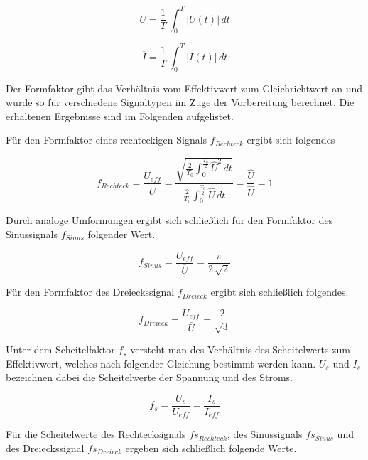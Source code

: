 \documentclass[11pt,ngerman]{scrartcl}
\begin{document}
\begin{equation}
	\overline{U} = \frac{1}{T}\,  \int_{0}^{T} |U(t)|\, dt
	\label{eq:ugl}
\end{equation}

\begin{equation}
	\overline{I} = \frac{1}{T}\,  \int_{0}^{T} |I(t)| \,dt
	\label{eq:igl}
\end{equation}

Der Formfaktor gibt das Verhältnis vom Effektivwert zum Gleichrichtwert an und wurde so für verschiedene Signaltypen im Zuge der Vorbereitung berechnet. Die erhaltenen Ergebnisse sind im Folgenden aufgelistet.

Für den Formfaktor eines rechteckigen Signals $f_{Rechteck}$ ergibt sich folgendes

\begin{equation}
	f_{Rechteck} = \frac{U_{eff}}{\overline{U}} = \frac{ \sqrt{ \frac{2}{T_0} \int_{0}^{\frac{T_0}{2}} \hat{U}^2 \,dt }}{\frac{2}{T_0} \int_{0}^{\frac{T_0}{2}} \hat{U} \,dt} = \frac{\hat{U}}{\hat{U}} = 1
	\label{eq:ffr}
\end{equation}

Durch analoge Umformungen ergibt sich schließlich für den Formfaktor des Sinussignals $f_{Sinus}$ folgender Wert.

\begin{equation}
	f_{Sinus} = \frac{U_{eff}}{\overline{U}} = \frac{\pi}{2 \, \sqrt{2}}
	\label{eq:ffs}
\end{equation}

Für den Formfaktor des Dreieckssignal $f_{Dreieck}$ ergibt sich schließlich folgendes.

\begin{equation}
	f_{Dreieck} = \frac{U_{eff}}{\overline{U}} = \frac{2}{\sqrt{3}}
	\label{eq:ffd}
\end{equation}

Unter dem Scheitelfaktor $f_s$ versteht man des Verhältnis des Scheitelwerts zum Effektivwert, welches nach folgender Gleichung bestimmt werden kann. ${U_s}$ und ${I_s}$ bezeichnen dabei die Scheitelwerte der Spannung und des Stroms.

\begin{equation}
	f_{s} = \frac{U_s}{U_{eff}}  = \frac{I_s}{I_{eff}}
	\label{eq:fs}
\end{equation}

Für die Scheitelwerte des Rechtecksignals $fs_{Rechteck}$, des Sinussignals
$fs_{Sinus}$ und des Dreieckssignal $fs_{Dreieck}$ ergeben sich schließlich
folgende Werte.
\end{document}
